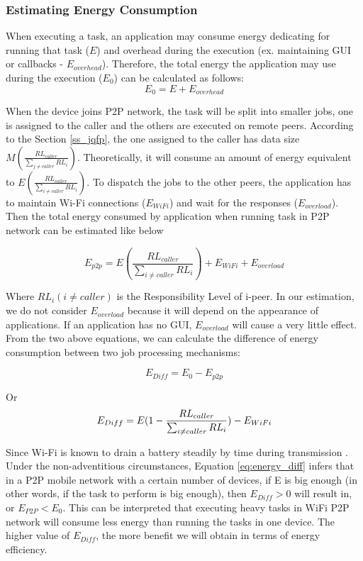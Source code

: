 \documentclass{sig-alternate}
\begin{document}
\subsubsection{Estimating Energy Consumption}
When executing a task, an application may consume energy dedicating for running that task ($E$) and overhead during the execution (ex. maintaining GUI or callbacks - $E_{overhead}$). Therefore, the total energy the application may use during the execution ($E_{0}$) can be calculated as follows:
$$E_{0} = E + E_{overhead}$$

When the device joins P2P network, the task will be split into smaller jobs, one is assigned to the caller and the others are executed on remote peers. According to the Section \ref{ss_jqfp}, the one assigned to the caller has data size $M(\frac{RL_{caller}}{\sum_{j \neq caller}{RL_{i}}})$. Theoretically, it will consume an amount of energy equivalent to $E(\frac{RL_{caller}}{\sum_{i \neq caller}{RL_{i}}})$. To dispatch the jobs to the other peers, the application has to maintain Wi-Fi connections ($E_{WiFi}$) and wait for the responses ($E_{overload}$). Then the total energy consumed by application when running task in P2P network can be estimated like below

\begin{small} $$E_{p2p} = E(\frac{RL_{caller}}{\sum_{i \neq caller}{RL_{i}}}) + E_{WiFi} + E_{overload}$$  \end{small}

Where $RL_{i} (i \neq caller)$ is the Responsibility Level of i-peer. In our estimation, we do not consider $E_{overload}$ because it will depend on the appearance of applications. If an application has no GUI, $E_{overload}$ will cause a very little effect. From the two above equations, we can calculate the difference of energy consumption between two job processing mechanisms:

\begin{small} $$E_{Diff} = E_{0} - E_{p2p}$$ \end{small} Or 
\begin{equation}
\label{eq:energy_diff} \small
E_{Diff} = E(1 - \frac{RL_{caller}}{\sum_{i \neq caller}{RL_{i}}}) - E_{WiFi}
\end{equation}

Since Wi-Fi is known to drain a battery steadily by time during transmission \cite{wifi_energy}. Under the non-adventitious circumstances, Equation \ref{eq:energy_diff} infers that in a P2P mobile network with a certain number of devices, if E is big enough (in other words, if the task to perform is big enough), then $E_{Diff} > 0$ will result in, or $E_{P2P} < E_{0}$. This can be interpreted that executing heavy tasks in WiFi P2P network will consume less energy than running the tasks in one device. The higher value of $E_{Diff}$, the more benefit we will obtain in terms of energy efficiency.
\end{document}
